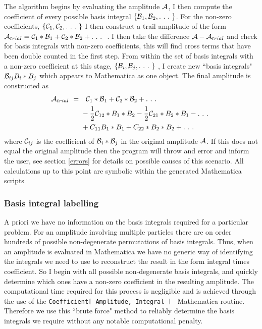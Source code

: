 The algorithm begins by evaluating the amplitude $\mathcal{A}$, I then compute the coefficient of every possible basis integral $\{\B_1,\B_2,.\ .\ .\ \}$.  For the non-zero coefficients, $\{\mathcal{C}_1,\mathcal{C}_2, .\ .\ .\  \}$ I then construct a trail amplitude of the form $\mathcal{A}_{trial} = \mathcal{C}_1 * \mathcal{B}_1 + \mathcal{C}_2 * \mathcal{B}_2 + .\ .\ .\ $ .  I then take the difference $\mathcal{A} - \mathcal{A}_{trial}$ and check for basis integrals with non-zero coefficients, this will find cross terms that have been double counted in the first step.  From within the set of basis integrals with a non-zero coefficient at this stage, $\{\mathcal{B}_i,\mathcal{B}_j,.\ .\ .\ \}$ , I create new ``basis integrals" $\mathcal{B}_{ij}  B_i*B_j$ which appears to Mathematica as one object.  The final amplitude is constructed as
\begin{align*}
 \A_{trial}\ = \ & \ \ \C_1 * \B_1 + \C_2 * \B_2 + .\ .\ .\ \\ 
  &-\frac{1}{2} \C_{12} * B_1*B_2  -\frac{1}{2} \C_{21} * B_2*B_1 - .\ .\ .\ \\
  & + C_{11} B_1*B_1 + C_{22}*B_2*B_2 + .\ .\ .\ 
\end{align*}
where $ \mathcal{C}_{ij}$ is the coefficient of  $\mathcal{B}_i*\mathcal{B}_j$ in the original amplitude $\mathcal{A}$.  If this does not equal the original amplitude then the program will throw and error and inform the user, see section \ref{errors} for details on possible causes of this scenario.  All calculations up to this point are symbolic within the generated Mathematica scripts

\subsubsection{Basis integral labelling}

A priori we have no information on the basis integrals required for a particular problem.  For an amplitude involving multiple particles there are on order hundreds of possible non-degenerate permutations of basis integrals.  Thus, when an amplitude is evaluated in Mathematica we have no generic way of identifying the integrals we need to use to reconstruct the result in the form integral times coefficient.  So I begin with all possible non-degenerate basis integrals, and quickly determine which ones have a non-zero coefficient in the resulting amplitude.  The computational time required for this process is negligible and is achieved through the use of the \lstinline{Coefficient[ Amplitude, Integral ] } Mathematica routine.  Therefore we use this ``brute force" method to reliably determine the basis integrals we require without any notable computational penalty.

